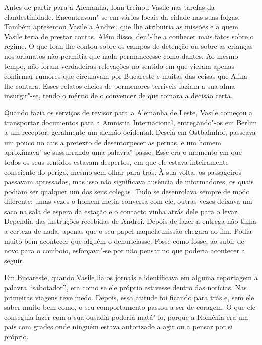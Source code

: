 Antes de partir para a Alemanha, Ioan treinou Vasile nas tarefas da
clandestinidade. Encontravam"-se em vários locais da cidade nas suas
folgas. Também apresentou Vasile a Andrei, que lhe atribuiria as missões
e a quem Vasile teria de prestar contas. Além disso, deu"-lhe a conhecer
mais fatos sobre o regime. O que Ioan lhe contou sobre os campos de
detenção ou sobre as crianças nos orfanatos não permitia que nada
permanecesse como dantes. Ao mesmo tempo, não foram verdadeiras
relevações no sentido em que vieram apenas confirmar rumores que
circulavam por Bucareste e muitas das coisas que Alina lhe contara.
Esses relatos cheios de pormenores terríveis faziam a sua alma
insurgir"-se, tendo o mérito de o convencer de que tomara a decisão
certa.

Quando fazia os serviços de revisor para a Alemanha
de Leste, Vasile começou a transportar documentos para a Amnistia
Internacional, entregando"-os em Berlim a um receptor, geralmente um
alemão ocidental. Descia em Ostbahnhof, passeava um pouco no cais a
pretexto de desentorpecer as pernas, e um homem aproximava"-se
sussurrando uma palavra"-passe. Esse era o momento em
que todos os seus sentidos estavam despertos, em que ele estava
inteiramente consciente do perigo, mesmo sem olhar para trás. À sua
volta, os passageiros passavam apressados, mas isso não significava
ausência de informadores, os quais podiam ser qualquer um dos seus
colegas. Tudo se desenrolava sempre de modo diferente: umas vezes o
homem metia conversa com ele, outras vezes deixava um saco na sala de
espera da estação e o contacto vinha atrás dele para o levar. Dependia
das instruções recebidas de Andrei. Depois de fazer a entrega não tinha
a certeza de nada, apenas que o seu papel naquela missão chegara ao fim.
Podia muito bem acontecer que alguém o denunciasse. Fosse como fosse, ao
subir de novo para o comboio, esforçava"-se por não pensar no que poderia
acontecer a seguir.

Em Bucareste, quando Vasile lia os jornais e identificava em alguma reportagem a palavra ``sabotador'', era como se ele próprio
estivesse dentro das notícias. Nas primeiras viagens teve medo. Depois,
essa atitude foi ficando para trás e, sem ele saber muito bem como, o
seu comportamento passou a ser de coragem. O que ele conseguia fazer
com a sua ousadia poderia matá"-lo, porque a Roménia era um país com
grades onde ninguém estava autorizado a agir ou a pensar por si próprio.

